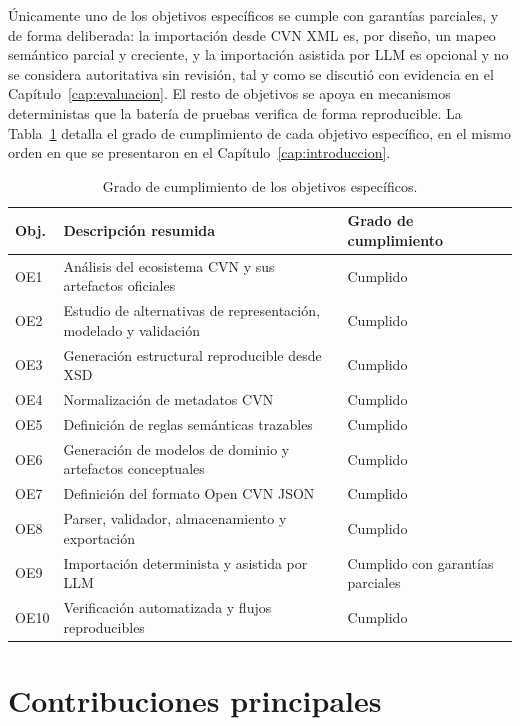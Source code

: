 Únicamente uno de los objetivos específicos se cumple con garantías
parciales, y de forma deliberada: la importación desde CVN XML es, por
diseño, un mapeo semántico parcial y creciente, y la importación asistida
por LLM es opcional y no se considera autoritativa sin revisión, tal y como
se discutió con evidencia en el Capítulo~\ref{cap:evaluacion}. El resto de
objetivos se apoya en mecanismos deterministas que la batería de pruebas
verifica de forma reproducible. La Tabla~\ref{tab:conclusiones_objetivos}
detalla el grado de cumplimiento de cada objetivo específico, en el mismo
orden en que se presentaron en el Capítulo~\ref{cap:introduccion}.

\begin{table}[htbp]
  \centering
  \footnotesize
  \renewcommand{\arraystretch}{1.5}
  \caption{Grado de cumplimiento de los objetivos específicos.}
  \label{tab:conclusiones_objetivos}
  \begin{tabular}{p{} p{} p{}}
    \hline
    \textbf{Obj.} & \textbf{Descripción resumida} & \textbf{Grado de cumplimiento} \\
    \hline
    OE1 & Análisis del ecosistema CVN y sus artefactos oficiales & Cumplido \\
    OE2 & Estudio de alternativas de representación, modelado y validación & Cumplido \\
    OE3 & Generación estructural reproducible desde XSD & Cumplido \\
    OE4 & Normalización de metadatos CVN & Cumplido \\
    OE5 & Definición de reglas semánticas trazables & Cumplido \\
    OE6 & Generación de modelos de dominio y artefactos conceptuales & Cumplido \\
    OE7 & Definición del formato Open CVN JSON & Cumplido \\
    OE8 & Parser, validador, almacenamiento y exportación & Cumplido \\
    OE9 & Importación determinista y asistida por LLM & Cumplido con garantías parciales \\
    OE10 & Verificación automatizada y flujos reproducibles & Cumplido \\
    \hline
  \end{tabular}
\end{table}

\section{Contribuciones principales}
\label{sec:conclusiones_contribuciones}

